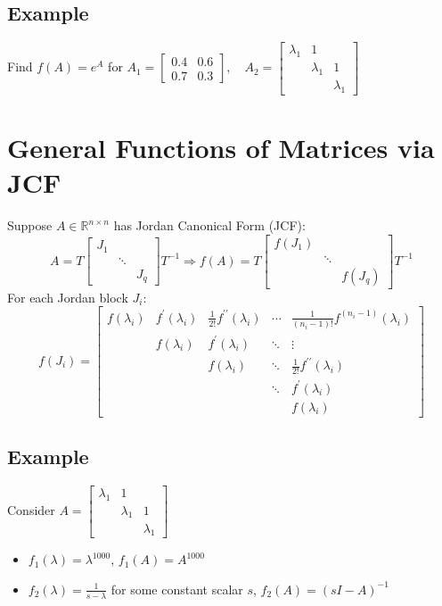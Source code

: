 \documentclass[10pt,a4paper,oneside]{article}
\begin{document}
\subsection*{Example}
Find $f(A)=e^{A}$ for $A_{1}=\left[\begin{array}{cc}{0.4} & {0.6} \\ {0.7} & {0.3}\end{array}\right], \quad A_{2}=\left[\begin{array}{ccc}{\lambda_{1}} & {1} & {} \\ {} & {\lambda_{1}} & {1} \\ {} & {} & {\lambda_{1}}\end{array}\right]$

\section{General Functions of Matrices via JCF}
Suppose $A \in \mathbb{R}^{n \times n}$ has Jordan Canonical Form (JCF):
\[
A=T\left[\begin{array}{lll}{J_{1}} & {} & {} \\ {} & {\ddots} & {} \\ {} & {} & {J_{q}}\end{array}\right] T^{-1} \Rightarrow f(A)=T\left[\begin{array}{lll}{f\left(J_{1}\right)} & {} & {} \\ {} & {\ddots} & {} \\ {} & {} & {f\left(J_{q}\right)}\end{array}\right] T^{-1}
\]
For each Jordan block $J_i$:
\[
f(J_i)=\left[\begin{array}{ccccc}{f\left(\lambda_{i}\right)} &{f^{\prime}\left(\lambda_{i}\right)}&{\frac{1}{2 !}f^{\prime\prime}\left(\lambda_{i}\right)}&\cdots&{\frac{1}{(n_i-1)!}f^{(n_i-1)}(\lambda_i)}\\
{} & {f\left(\lambda_{i}\right)} & {f^{\prime}\left(\lambda_{i}\right)} & {\ddots}  & {\vdots} \\ 
{} & {} & {f\left(\lambda_{i}\right)} & {\ddots} & {\frac{1}{2 !} f^{\prime \prime}\left(\lambda_{i}\right)} \\ 
{} & {} & {} & {\ddots} & {f^{\prime}\left(\lambda_{i}\right)} \\
 {} & {} & {} &{}& {f\left(\lambda_{i}\right)}\end{array}\right]
\]
\subsection*{Example}
Consider $A=\left[\begin{array}{lll}{\lambda_{1}} & {1} \\ {} & {\lambda_{1}} & {1} \\ {} & {} & {\lambda_{1}}\end{array}\right]$
\begin{itemize}
\item $f_{1}(\lambda)=\lambda^{1000}$, $f_{1}(A)=A^{1000}$
\item $f_{2}(\lambda)=\frac{1}{s-\lambda}$ for some constant scalar $s$, $f_{2}(A)=(sI-A)^{-1}$

\end{itemize}
\end{document}
